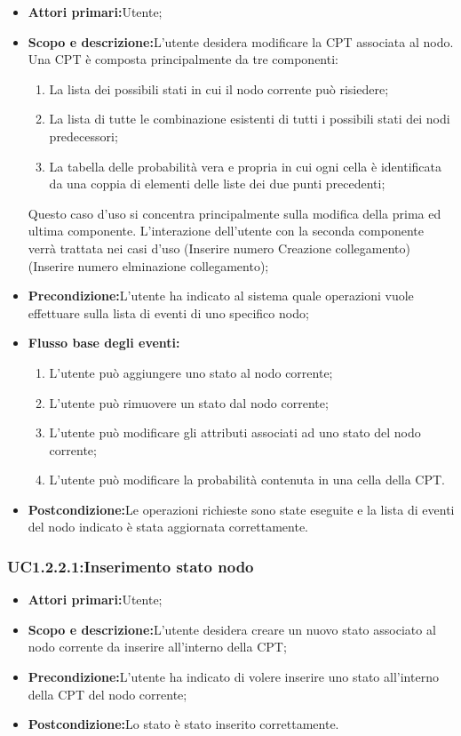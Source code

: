 \begin{itemize}
	\item{\textbf{Attori primari:}Utente;}
	\item{\textbf{Scopo e descrizione:}L'utente desidera modificare la CPT associata al nodo. Una CPT è composta principalmente da tre componenti:
	\begin{enumerate}
		\item{La lista dei possibili stati in cui il nodo corrente può risiedere;}
		\item{La lista di tutte le combinazione esistenti di tutti i possibili stati dei nodi predecessori;}
		\item{La tabella delle probabilità vera e propria in cui ogni cella è identificata da una coppia di elementi delle liste dei due punti precedenti;}
	\end{enumerate}
	Questo caso d'uso si concentra principalmente sulla modifica della prima ed ultima componente. L'interazione dell'utente con la seconda componente verrà trattata nei casi d'uso (Inserire numero Creazione collegamento)(Inserire numero elminazione collegamento);}
	\item{\textbf{Precondizione:}L'utente ha indicato al sistema quale operazioni vuole effettuare sulla lista di eventi di uno specifico nodo;}
	\item{\textbf{Flusso base degli eventi:}}
	\begin{enumerate}
		\item{L'utente può aggiungere uno stato al nodo corrente;}
		\item{L'utente può rimuovere un stato dal nodo corrente;}
		\item{L'utente può modificare gli attributi associati ad uno stato del nodo corrente;}
		\item{L'utente può modificare la probabilità contenuta in una cella della CPT.}
	\end{enumerate}
	\item{\textbf{Postcondizione:}Le operazioni richieste sono state eseguite e la lista di eventi del nodo indicato è stata aggiornata correttamente.}
\end{itemize}
\subsubsection{UC1.2.2.1:Inserimento stato nodo}
\begin{itemize}
	\item{\textbf{Attori primari:}Utente;}
	\item{\textbf{Scopo e descrizione:}L'utente desidera creare un nuovo stato associato al nodo corrente da inserire all'interno della CPT;}
	\item{\textbf{Precondizione:}L'utente ha indicato di volere inserire uno stato all'interno della CPT del nodo corrente;}
	\item{\textbf{Postcondizione:}Lo stato è stato inserito correttamente.}
\end{itemize}
